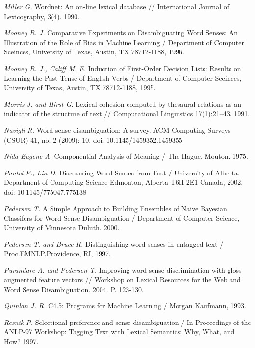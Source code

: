 \documentclass{article}
\begin{document}
\begin{articletext}
\begin{thebibliography}{9}
\textit{Miller G. }Wordnet: An on-line lexical database // International Journal of Lexicography, 3(4). 1990.

\textit{Mooney R. J. }Comparative Experiments on Disambiguating Word Senses:
An Illustration of the Role of Bias in Machine Learning / Department of Computer Sceinces, University of Texas, Austin, TX 78712-1188, 1996.

\textit{Mooney R. J., Califf M. E. }Induction of First-Order Decision Lists: Results on Learning the Past Tense of English Verbs / Department of Computer Sceinces, University of Texas, Austin, TX 78712-1188, 1995.

\textit{Morris J. and  Hirst G. }Lexical cohesion computed by thesaural relations as an indicator of the structure of text // Computational Linguistics 17(1):21–43. 1991. 

\textit{Navigli R. }Word sense disambiguation: A survey. ACM Computing Surveys (CSUR) 41, no. 2 (2009): 10. doi: 10.1145/1459352.1459355

\textit{Nida Eugene A. }Componential Analysis of Meaning / The Hague, Mouton. 1975.


\textit{Pantel P.,  Lin D. }Discovering Word Senses from Text / University of Alberta. Department of Computing Science Edmonton, Alberta T6H 2E1 Canada, 2002. doi: 10.1145/775047.775138

\textit{Pedersen T. }A Simple Approach to Building Ensembles of Naive Bayesian Classifers for Word Sense Disambiguation / Department of Computer Science, University of Minnesota Duluth. 2000.

\textit{Pedersen T. and  Bruce R. }Distinguishing word senses in untagged text / Proc.EMNLP.Providence, RI, 1997.

\textit{ Purandare A. and  Pedersen T. }Improving word sense discrimination with gloss augmented feature vectors // Workshop on Lexical Resources for the Web and Word Sense Disambiguation.  2004.  P. 123-130. 

\textit{Quinlan J. R. }C4.5: Programs for Machine Learning / Morgan Kaufmann, 1993. 

\textit{Resnik P. }Selectional preference and sense disambiguation / In Proceedings of the ANLP-97 Workshop: Tagging Text with Lexical Semantics: Why, What, and How? 1997.


\end{thebibliography}
\end{articletext}
\end{document}
